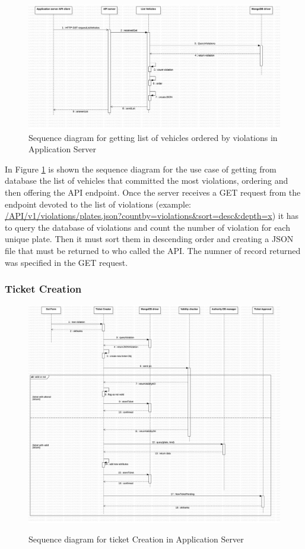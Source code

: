 \begin{figure}[H]
\centering
\includegraphics[width=\textwidth]{Images/DDSeqSeverList.png}
\caption{\label{fig:DDSeqSeverList} Sequence diagram for getting list of vehicles ordered by violations in Application Server  }
\end{figure}
In Figure \ref{fig:DDSeqSeverList} is shown the sequence diagram for the use case of getting from database the list of vehicles that committed the most violations, ordering and then offering the API endpoint.
Once the server receives a GET request from the endpoint devoted to the list of violations (example: \url{/API/v1/violations/plates.json?countby=violations&sort=desc&depth=x}) it has to query the database of violations and count the number of violation for each unique plate. Then it must sort them in descending order and creating a JSON file that must be returned to who called the API. The numner of record returned was specified in the GET request.


\subsubsection{Ticket Creation}%
\begin{figure}[H]
\centering
\includegraphics[width=\textwidth]{Images/DDSeqSeverTickCreat.png}
\caption{\label{fig:DDSeqSeverTickCreat}} Sequence diagram for ticket Creation in Application Server
\end{figure}

